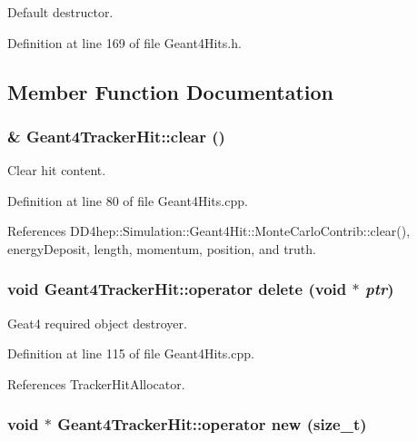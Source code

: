 Default destructor. 

Definition at line 169 of file Geant4Hits.h.

\subsection{Member Function Documentation}
\hypertarget{class_d_d4hep_1_1_simulation_1_1_geant4_tracker_hit_ae4ad76e698755a72feaf4c7f38d5281f}{
\subsubsection[{clear}]{ \& Geant4TrackerHit::clear ()}}
\label{class_d_d4hep_1_1_simulation_1_1_geant4_tracker_hit_ae4ad76e698755a72feaf4c7f38d5281f}


Clear hit content. 

Definition at line 80 of file Geant4Hits.cpp.

References DD4hep::Simulation::Geant4Hit::MonteCarloContrib::clear(), energyDeposit, length, momentum, position, and truth.\hypertarget{class_d_d4hep_1_1_simulation_1_1_geant4_tracker_hit_a40caf2e6d8ebdf643bd26f27aff917b0}{
\subsubsection[{operator delete}]{\setlength{\rightskip}{0pt plus 5cm}void Geant4TrackerHit::operator delete (void $\ast$ {\em ptr})}}
\label{class_d_d4hep_1_1_simulation_1_1_geant4_tracker_hit_a40caf2e6d8ebdf643bd26f27aff917b0}


Geat4 required object destroyer. 

Definition at line 115 of file Geant4Hits.cpp.

References TrackerHitAllocator.\hypertarget{class_d_d4hep_1_1_simulation_1_1_geant4_tracker_hit_a66a40ac322757dd8e5398a28dbd04334}{
\subsubsection[{operator new}]{\setlength{\rightskip}{0pt plus 5cm}void $\ast$ Geant4TrackerHit::operator new (size\_\-t)}}
\label{class_d_d4hep_1_1_simulation_1_1_geant4_tracker_hit_a66a40ac322757dd8e5398a28dbd04334}


